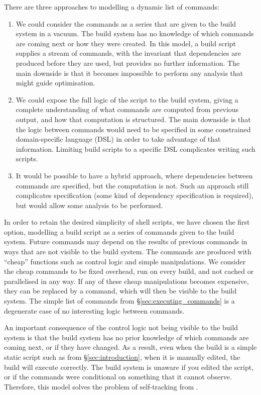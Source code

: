 There are three approaches to modelling a dynamic list of commands:

\begin{enumerate}
\item We could consider the commands as a series that are given to the build system in a vacuum. The build system has no knowledge of which commands are coming next or how they were created. In this model, a build script supplies a stream of commands, with the invariant that dependencies are produced before they are used, but provides no further information. The main downside is that it becomes impossible to perform any analysis that might guide optimisation.
\item We could expose the full logic of the script to the build system, giving a complete understanding of what commands are computed from previous output, and how that computation is structured. The main downside is that the logic between commands would need to be specified in some constrained domain-specific language (DSL) in order to take advantage of that information. Limiting build scripts to a specific DSL complicates writing such scripts.
\item It would be possible to have a hybrid approach, where dependencies between commands are specified, but the computation is not. Such an approach still complicates specification (some kind of dependency specification is required), but would allow some analysis to be performed.
\end{enumerate}

In order to retain the desired simplicity of shell scripts, we have chosen the first option, modelling a build script as a series of commands given to the build system. Future commands may depend on the results of previous commands in ways that are not visible to the build system. The commands are produced with ``cheap'' functions such as control logic and simple manipulations. We consider the cheap commands to be fixed overhead, run on every build, and not cached or parallelised in any way. If any of these cheap manipulations becomes expensive, they can be replaced by a command, which will then be visible to the build system. The simple list of commands from \S\ref{sec:executing_commands} is a degenerate case of no interesting logic between commands.

An important consequence of the control logic not being visible to the build system is that the build system has no prior knowledge of which commands are coming next, or if they have changed. As a result, even when the build is a simple static script such as from \S\ref{sec:introduction}, when it is manually edited, the build will execute correctly. The build system is unaware if you edited the script, or if the commands were conditional on something that it cannot observe. Therefore, this model solves the problem of self-tracking from \citet[\S6.5]{build_systems_a_la_carte}.

